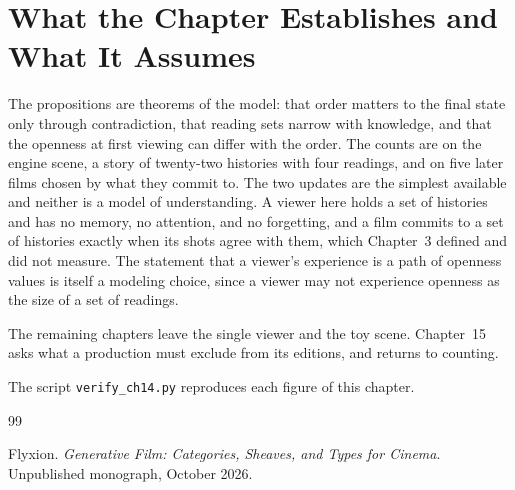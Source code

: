 \documentclass[11pt,twoside,openright]{book}
\theoremstyle{plain}
\theoremstyle{definition}
\theoremstyle{remark}
\begin{document}
\section{What the Chapter Establishes and What It Assumes}\label{sec:limits14}

The propositions are theorems of the model: that order matters to the final state only through contradiction, that reading sets narrow with knowledge, and that the openness at first viewing can differ with the order. The counts are on the engine scene, a story of twenty-two histories with four readings, and on five later films chosen by what they commit to. The two updates are the simplest available and neither is a model of understanding. A viewer here holds a set of histories and has no memory, no attention, and no forgetting, and a film commits to a set of histories exactly when its shots agree with them, which Chapter~3 defined and did not measure. The statement that a viewer's experience is a path of openness values is itself a modeling choice, since a viewer may not experience openness as the size of a set of readings.

The remaining chapters leave the single viewer and the toy scene. Chapter~15 asks what a production must exclude from its editions, and returns to counting.

The script \texttt{verify\_ch14.py} reproduces each figure of this chapter.

\begin{thebibliography}{99}

Flyxion.
\newblock \emph{Generative Film: Categories, Sheaves, and Types for Cinema}.
\newblock Unpublished monograph, October 2026.

\end{thebibliography}
\end{document}
